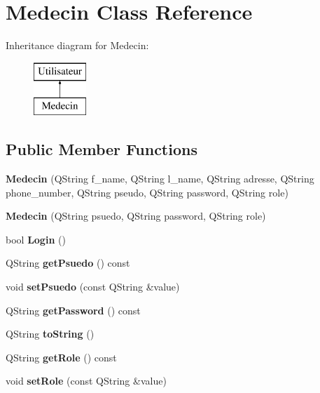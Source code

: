 \hypertarget{class_medecin}{}\section{Medecin Class Reference}
\label{class_medecin}
Inheritance diagram for Medecin\+:\begin{figure}[H]
\begin{center}
\leavevmode
\includegraphics[height=2.000000cm]{class_medecin}
\end{center}
\end{figure}
\subsection*{Public Member Functions}
\begin{DoxyCompactItemize}
\item 
\mbox{\label{class_medecin_a5a919763f1f842a02aff5d158852e1e5}} 
{\bfseries Medecin} (Q\+String f\+\_\+name, Q\+String l\+\_\+name, Q\+String adresse, Q\+String phone\+\_\+number, Q\+String pseudo, Q\+String password, Q\+String role)
\item 
\mbox{\label{class_medecin_afd4e41fdf65e83d48797e01a1f7368d5}} 
{\bfseries Medecin} (Q\+String psuedo, Q\+String password, Q\+String role)
\item 
\mbox{\label{class_medecin_a01e4a472a632ecbbff5875f82887d3f1}} 
bool {\bfseries Login} ()
\item 
\mbox{\label{class_medecin_afbafe52dee9f67c274bf13cbe26ee517}} 
Q\+String {\bfseries get\+Psuedo} () const
\item 
\mbox{\label{class_medecin_a2578faa446f961f05dc8578d1cf706d9}} 
void {\bfseries set\+Psuedo} (const Q\+String \&value)
\item 
\mbox{\label{class_medecin_a0ea82c3c050b017689dc55d2f2de73b8}} 
Q\+String {\bfseries get\+Password} () const
\item 
\mbox{\label{class_medecin_ae009584f0888a6d2d368f61dc768e192}} 
Q\+String {\bfseries to\+String} ()
\item 
\mbox{\label{class_medecin_a10a0e712d72febbe4a509e277cea94bf}} 
Q\+String {\bfseries get\+Role} () const
\item 
\mbox{\label{class_medecin_ae98a1e8b43f23aeaf151e300e568c43f}} 
void {\bfseries set\+Role} (const Q\+String \&value)
\end{DoxyCompactItemize}

